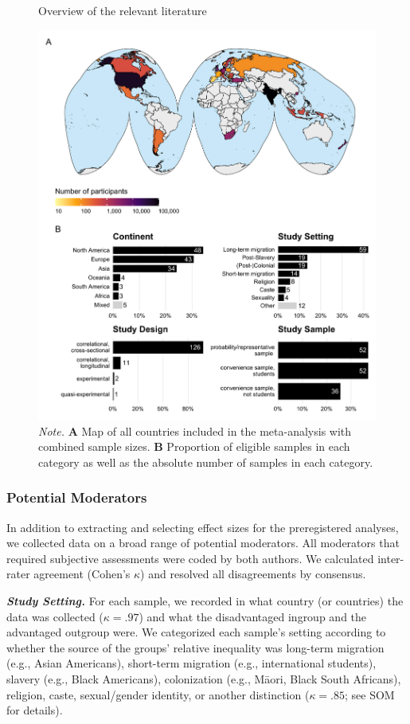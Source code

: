 \documentclass[12pt, letterpaper]{article}
\begin{document}
\begin{figure}
\centering
\caption{Overview of the relevant literature}
\includegraphics[scale=1]{../figures/figure-2}
\caption*{\textit{Note.} \textbf{A} Map of all countries included in the meta-analysis with combined sample sizes. \textbf{B} Proportion of eligible samples in each category as well as the absolute number of samples in each category.}
\label{fig:f2}
\end{figure}

\hypertarget{potential-moderators}{%
\subsubsection{Potential Moderators}\label{potential-moderators}}

In addition to extracting and selecting effect sizes for the
preregistered analyses, we collected data on a broad range of potential
moderators. All moderators that required subjective assessments were
coded by both authors. We calculated inter-rater agreement (Cohen's
\(\kappa\)) and resolved all disagreements by consensus.

\textbf{\emph{Study Setting.}} For each sample, we recorded in what
country (or countries) the data was collected (\(\kappa = .97\)) and
what the disadvantaged ingroup and the advantaged outgroup were. We
categorized each sample's setting according to whether the source of the
groups' relative inequality was long-term migration (e.g., Asian
Americans), short-term migration (e.g., international students), slavery
(e.g., Black Americans), colonization (e.g., Māori, Black South
Africans), religion, caste, sexual/gender identity, or another
distinction (\(\kappa = .85\); see SOM for details).
\end{document}
